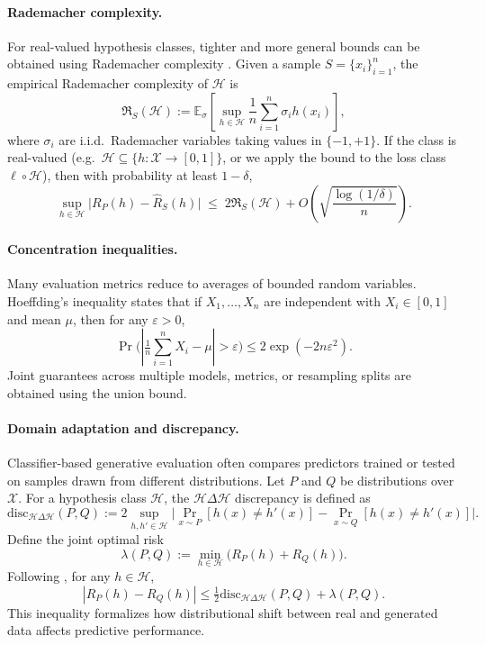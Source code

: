 \paragraph{Rademacher complexity.}
For real-valued hypothesis classes, tighter and more general bounds can be
obtained using Rademacher complexity
\citep{bartlett2002rademacher}.
Given a sample $S=\{x_i\}_{i=1}^n$, the empirical Rademacher complexity of
$\mathcal{H}$ is
\[
\mathfrak{R}_S(\mathcal{H})
:=
\mathbb{E}_{\sigma}
\left[
\sup_{h\in\mathcal{H}}
\frac{1}{n}\sum_{i=1}^n \sigma_i h(x_i)
\right],
\]
where $\sigma_i$ are i.i.d.\ Rademacher variables taking values in $\{-1,+1\}$.
If the class is real-valued (e.g.\ $\mathcal{H}\subseteq\{h:\mathcal{X}\to[0,1]\}$,
or we apply the bound to the loss class $\ell\circ\mathcal{H}$),
then with probability at least $1-\delta$,
\[
\sup_{h\in\mathcal{H}}
\bigl|R_P(h)-\widehat R_S(h)\bigr|
\;\le\;
2\mathfrak{R}_S(\mathcal{H})
+ O\!\left(\sqrt{\frac{\log(1/\delta)}{n}}\right).
\]

\paragraph{Concentration inequalities.}
Many evaluation metrics reduce to averages of bounded random variables.
Hoeffding’s inequality \citep{hoeffding1963probability} states that if
$X_1,\dots,X_n$ are independent with $X_i\in[0,1]$ and mean $\mu$, then for any
$\varepsilon>0$,
\[
\Pr\bigl(|\tfrac{1}{n}\sum_{i=1}^n X_i - \mu| > \varepsilon\bigr)
\le 2\exp(-2n\varepsilon^2).
\]
Joint guarantees across multiple models, metrics, or resampling splits are
obtained using the union bound.

\paragraph{Domain adaptation and discrepancy.}
Classifier-based generative evaluation often compares predictors trained or
tested on samples drawn from different distributions.
Let $P$ and $Q$ be distributions over $\mathcal{X}$.
For a hypothesis class $\mathcal{H}$, the
$\mathcal{H}\Delta\mathcal{H}$ discrepancy is defined as
\[
\mathrm{disc}_{\mathcal{H}\Delta\mathcal{H}}(P,Q)
:=
2 \sup_{h,h'\in\mathcal{H}}
\bigl|
\Pr_{x\sim P}[h(x)\neq h'(x)]
-
\Pr_{x\sim Q}[h(x)\neq h'(x)]
\bigr|.
\]
Define the joint optimal risk
\[
\lambda(P,Q) := \min_{h\in\mathcal{H}}
\bigl(R_P(h) + R_Q(h)\bigr).
\]
Following \citet{ben2010theory}, for any $h\in\mathcal{H}$,
\[
|R_P(h)-R_Q(h)|
\le \tfrac{1}{2}\mathrm{disc}_{\mathcal{H}\Delta\mathcal{H}}(P,Q) + \lambda(P,Q).
\]
This inequality formalizes how distributional shift between real and generated
data affects predictive performance.

